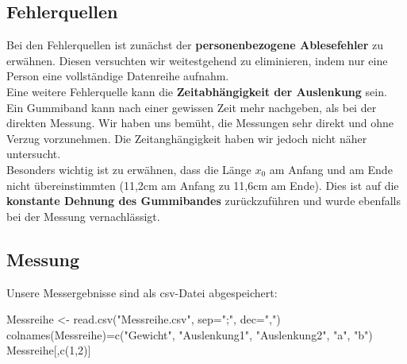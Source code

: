 \documentclass[
]{article}
\newenvironment{Shaded}{\begin{snugshade}}{\end{snugshade}}
\newcommand{\AttributeTok}[1]{\textcolor[rgb]{0.77,0.63,0.00}{#1}}
\newcommand{\DecValTok}[1]{\textcolor[rgb]{0.00,0.00,0.81}{#1}}
\newcommand{\FunctionTok}[1]{\textcolor[rgb]{0.00,0.00,0.00}{#1}}
\newcommand{\NormalTok}[1]{#1}
\newcommand{\OtherTok}[1]{\textcolor[rgb]{0.56,0.35,0.01}{#1}}
\newcommand{\StringTok}[1]{\textcolor[rgb]{0.31,0.60,0.02}{#1}}
\begin{document}
\hypertarget{fehlerquellen}{%
\subsection{Fehlerquellen}\label{fehlerquellen}}

Bei den Fehlerquellen ist zunächst der \textbf{personenbezogene
Ablesefehler} zu erwähnen. Diesen versuchten wir weitestgehend zu
eliminieren, indem nur eine Person eine vollständige Datenreihe
aufnahm.\\

Eine weitere Fehlerquelle kann die \textbf{Zeitabhängigkeit der
Auslenkung} sein. Ein Gummiband kann nach einer gewissen Zeit mehr
nachgeben, als bei der direkten Messung. Wir haben uns bemüht, die
Messungen sehr direkt und ohne Verzug vorzunehmen. Die Zeitanghängigkeit
haben wir jedoch nicht näher untersucht.\\

Besonders wichtig ist zu erwähnen, dass die Länge \(x_0\) am Anfang und
am Ende nicht übereinstimmten (11,2cm am Anfang zu 11,6cm am Ende). Dies
ist auf die \textbf{konstante Dehnung des Gummibandes} zurückzuführen
und wurde ebenfalls bei der Messung vernachlässigt.

\hypertarget{messung}{%
\subsection{Messung}\label{messung}}

Unsere Messergebnisse sind als csv-Datei abgespeichert:

\begin{Shaded}
\begin{Highlighting}[]
\NormalTok{Messreihe }\OtherTok{\textless{}{-}} \FunctionTok{read.csv}\NormalTok{(}\StringTok{"Messreihe.csv"}\NormalTok{, }\AttributeTok{sep=}\StringTok{";"}\NormalTok{, }\AttributeTok{dec=}\StringTok{","}\NormalTok{)}
\FunctionTok{colnames}\NormalTok{(Messreihe)}\OtherTok{=}\FunctionTok{c}\NormalTok{(}\StringTok{"Gewicht"}\NormalTok{, }\StringTok{"Auslenkung1"}\NormalTok{,  }\StringTok{"Auslenkung2"}\NormalTok{, }\StringTok{"a"}\NormalTok{, }\StringTok{"b"}\NormalTok{)}
\NormalTok{Messreihe[,}\FunctionTok{c}\NormalTok{(}\DecValTok{1}\NormalTok{,}\DecValTok{2}\NormalTok{)]}
\end{Highlighting}
\end{Shaded}
\end{document}
